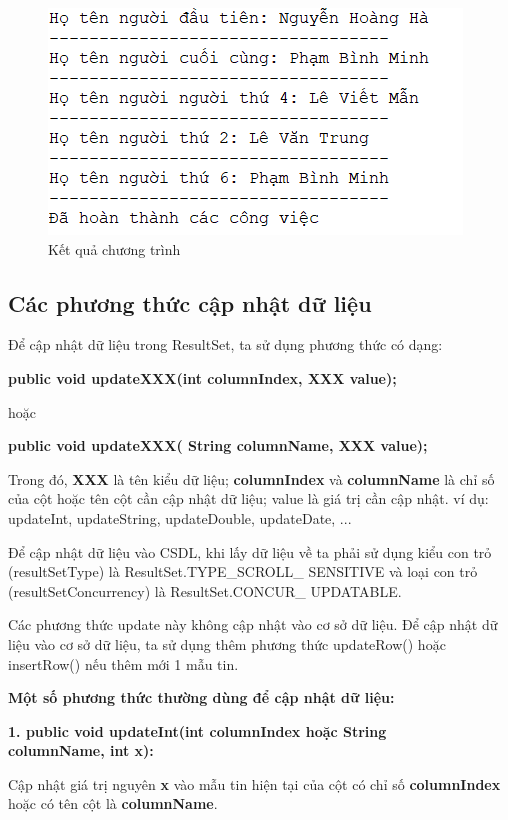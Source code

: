 \begin{figure}[!ht]
	\centering
	\includegraphics[scale=0.9]{Figures//Hinh37.png}
	\caption{ Kết quả chương trình }\label{hinh37} 
\end{figure}

\subsection{Các phương thức cập nhật dữ liệu}

Để cập nhật dữ liệu trong ResultSet, ta sử dụng phương thức có dạng:
\begin{center}
	\textbf{ public void updateXXX(int columnIndex, XXX value);}
\end{center}	
	hoặc
\begin{center}	
	\textbf{ public void updateXXX( String columnName, XXX value);} 
\end{center}
Trong đó, \textbf{XXX} là tên kiểu dữ liệu; \textbf{columnIndex} và \textbf{columnName} là chỉ số của cột hoặc tên cột cần cập nhật dữ liệu; value là giá trị cần cập nhật. ví dụ: updateInt, updateString, updateDouble, updateDate, ...

Để cập nhật dữ liệu vào CSDL, khi lấy dữ liệu về ta phải sử dụng kiểu con trỏ (resultSetType) là ResultSet.TYPE\_SCROLL\_ SENSITIVE và loại con trỏ (resultSetConcurrency) là ResultSet.CONCUR\_ UPDATABLE.

Các phương thức update này không cập nhật vào cơ sở dữ liệu. Để cập nhật dữ liệu vào cơ sở dữ liệu, ta sử dụng thêm phương thức updateRow() hoặc insertRow() nếu thêm mới 1 mẫu tin.

\textbf{Một số phương thức thường dùng để cập nhật dữ liệu:}

\textbf{1. public void updateInt(int columnIndex hoặc String \\ columnName, int x):}

Cập nhật giá trị nguyên \textbf{x} vào mẫu tin hiện tại của cột có chỉ số \textbf{columnIndex} hoặc có tên cột là \textbf{columnName}.


